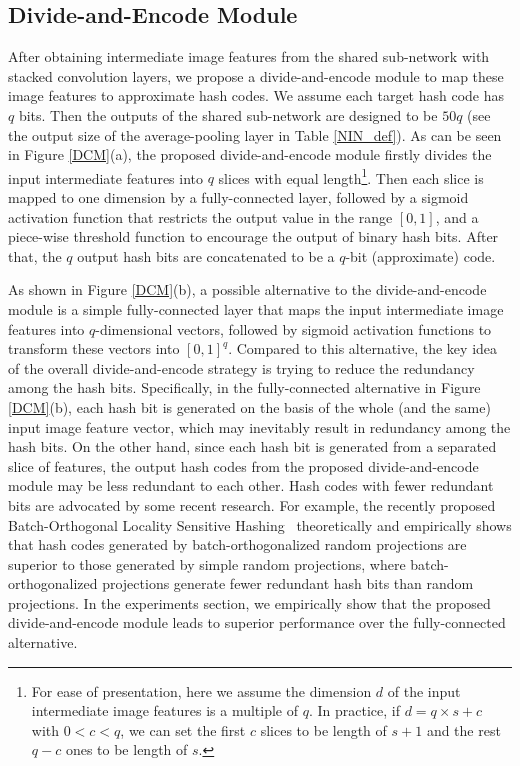 \documentclass[10pt,twocolumn,letterpaper]{article}
\begin{document}
\subsection{Divide-and-Encode Module}
After obtaining intermediate image features from the shared
sub-network with stacked convolution layers, we propose a
divide-and-encode module to map these image features to approximate
hash codes. We assume each target hash code has $q$ bits. Then the outputs of the shared sub-network are designed to be $50q$ (see the output size of the average-pooling layer in Table \ref{NIN_def}). As can be
seen in Figure \ref{DCM}(a), the proposed divide-and-encode
module firstly divides the input intermediate features into $q$
slices with equal length\footnote{For ease of presentation, here we
assume the dimension $d$ of the input intermediate image features is
a multiple of $q$. In practice, if $d=q\times s +c$ with $0<c<q$, we
can set the first $c$ slices to be length of $s+1$ and the rest
$q-c$ ones to be length of $s$.}. Then each slice is mapped to one
dimension by a fully-connected layer, followed by a sigmoid
activation function that restricts the output value in the range
$[0,1]$, and a piece-wise threshold function to encourage the
output of binary hash bits. After that, the $q$ output hash bits are
concatenated to be a $q$-bit (approximate) code.

As shown in Figure \ref{DCM}(b), a possible alternative to the
divide-and-encode module is a simple fully-connected layer that
maps the input intermediate image features into $q$-dimensional
vectors, followed by sigmoid activation functions to transform these
vectors into $[0,1]^q$. Compared to this alternative, the key idea
of the overall divide-and-encode strategy is trying to reduce
the redundancy among the hash bits. Specifically, in the
fully-connected alternative in Figure \ref{DCM}(b), each hash bit is
generated on the basis of the whole (and the same) input image
feature vector, which may inevitably result in redundancy among the
hash bits. On the other hand, since each hash bit is generated from
a separated slice of features, the output hash codes from the
proposed divide-and-encode module may be less redundant to each
other. Hash codes with fewer redundant bits are advocated by some
recent research. For example, the recently proposed Batch-Orthogonal
Locality Sensitive Hashing~\cite{BOLSH} theoretically and
empirically shows that hash codes generated by batch-orthogonalized
random projections are superior to those generated by simple random
projections, where batch-orthogonalized projections generate fewer
redundant hash bits than random projections. In the experiments
section, we empirically show that the proposed
divide-and-encode module leads to superior performance over the
fully-connected alternative.
\end{document}
